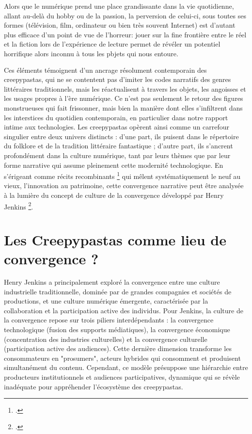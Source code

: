 \documentclass[12pt,a4paper,oneside,titlepage]{book} %
\begin{document}
\par

Alors que le numérique prend une place grandissante dans la vie quotidienne, allant au-delà du hobby ou de la passion, la perversion de celui-ci, sous toutes ses formes (télévision, film, ordinateur ou bien très souvent Internet) est d'autant plus efficace d'un point de vue de l'horreur: jouer sur la fine frontière entre le réel et la fiction lors de l'expérience de lecture permet de révéler un potentiel horrifique alors inconnu à tous les pbjets qui nous entoure. 
\par
Ces éléments témoignent d'un ancrage résolument contemporain des creepypastas, qui ne se contentent pas d'imiter les codes narratifs des genres littéraires traditionnels, mais les réactualisent à travers les objets, les angoisses et les usages propres à l'ère numérique. Ce n'est pas seulement le retour des figures monstrueuses qui fait frissonner, mais bien la manière dont elles s'infiltrent dans les interstices du quotidien contemporain, en particulier dans notre rapport intime aux technologies.
Les creepypastas opèrent ainsi comme un carrefour singulier entre deux univers distincts : d'une part, ils puisent dans le répertoire du folklore et de la tradition littéraire fantastique ; d'autre part, ils s'ancrent profondément dans la culture numérique, tant par leurs thèmes que par leur forme narrative qui assume pleinement cette modernité technologique. En s'érigeant comme récits recombinants \footcite{jacobs_character_1990} qui mêlent systématiquement le neuf au vieux, l'innovation au patrimoine, cette convergence narrative peut être analysée à la lumière du concept de culture de la convergence développé par Henry Jenkins \footcite{jenkins_convergence_2006}.
\section{Les Creepypastas comme lieu de convergence ? }

Henry Jenkins a principalement exploré la convergence entre une culture industrielle traditionnelle, dominée par de grandes compagnies et sociétés de productions, et une culture numérique émergente, caractérisée par la collaboration et la participation active des individus. Pour Jenkins, la culture de la convergence repose sur trois piliers interdépendants : la convergence technologique (fusion des supports médiatiques), la convergence économique (concentration des industries culturelles) et la convergence culturelle (participation active des audiences). Cette dernière dimension transforme les consommateurs en "prosumers", acteurs hybrides qui consomment et produisent simultanément du contenu. Cependant, ce modèle présuppose une hiérarchie entre producteurs institutionnels et audiences participatives, dynamique qui se révèle inadéquate pour appréhender l'écosystème des creepypastas.
\end{document}
